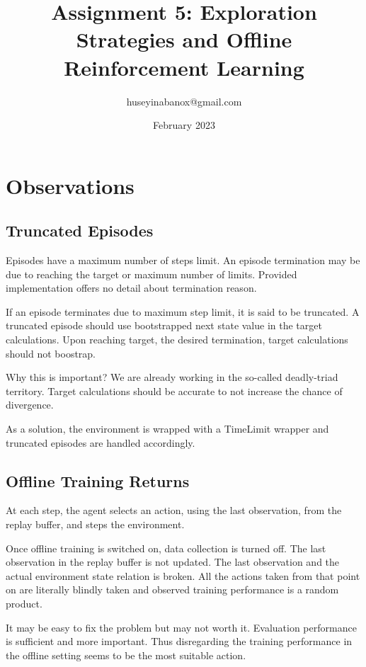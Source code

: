 \documentclass[11pt]{article}
\title{Assignment 5: Exploration Strategies and Offline Reinforcement Learning}
\author{huseyinabanox@gmail.com}
\date{February 2023}
\begin{document}
    \maketitle

    \section*{Observations}

    \subsection*{Truncated Episodes}

    Episodes have a maximum number of steps limit.
    An episode termination may be due to reaching the target or maximum number of limits.
    Provided implementation offers no detail about termination reason.

    If an episode terminates due to maximum step limit, it is said to be truncated.
    A truncated episode should use bootstrapped next state value in the target calculations.
    Upon reaching target, the desired termination, target calculations should not boostrap.

    Why this is important?
    We are already working in the so-called deadly-triad territory.
    Target calculations should be accurate to not increase the chance of divergence.

    As a solution, the environment is wrapped with a TimeLimit wrapper and truncated episodes are handled accordingly.

    \subsection*{Offline Training Returns}

    At each step, the agent selects an action, using the last observation, from the replay buffer, and steps the environment.

    Once offline training is switched on, data collection is turned off.
    The last observation in the replay buffer is not updated.
    The last observation and the actual environment state relation is broken.
    All the actions taken from that point on are literally blindly taken and observed training performance is a random product.

    It may be easy to fix the problem but may not worth it.
    Evaluation performance is sufficient and more important.
    Thus disregarding the training performance in the offline setting seems to be the most suitable action.
\end{document}
